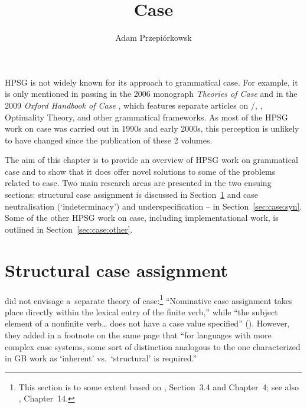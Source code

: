 \documentclass[output=paper]{langsci/langscibook}
\author{%
	Adam Przepiórkows­k\affiliation{Polish Academy of Sciences}%
}
\title{Case}
\begin{document}
\label{chap-case}

\maketitle{}

HPSG is not widely known for its approach to grammatical case.  For example, it is only mentioned in passing in the 2006 monograph \emph{Theories of Case} \citep[225]{butt:06} and in the 2009 \emph{Oxford Handbook of Case} \citep[43]{mal:spe:09}, which features separate articles on \gb/\minimalism, \lfg, Optimality Theory, and other grammatical frameworks.  As most of the HPSG work on case was carried out in 1990s and early 2000s, this perception is unlikely to have changed since the publication of these 2 volumes.

The aim of this chapter is to provide an overview of HPSG work on grammatical case and to show that it does offer novel solutions to some of the problems related to case.  Two main research areas are presented in the two ensuing sections: structural case assignment is discussed in Section~\ref{sec:case:str} and case neutralisation (`indeterminacy’) and underspecification – in Section~\ref{sec:case:syn}.  Some of the other HPSG work on case, including implementational work, is outlined in Section~\ref{sec:case:other}.  %


\section{Structural case assignment}
\label{sec:case:str}

\citet{ps2} did not envisage a~separate theory of case:\footnote{This section is to some extent based on \citealt{Prze99b}, Section~3.4 and Chapter~4; see also \citealt{MuellerLehrbuch3}, Chapter~14.} “Nominative case assignment takes place directly within the lexical entry of the finite verb,” while “the subject  element of a nonfinite verb… does not have a case value specified” ().  However, they added in a footnote on the same page that “for languages with more complex case systems, some sort of distinction analogous to the one characterized in GB work as `inherent’ vs.~`structural’ is required.”  
\end{document}
